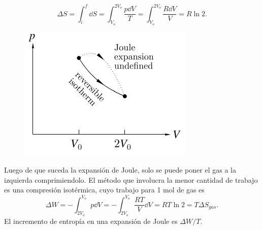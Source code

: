 	$$ \Delta S = \int _i ^f \dd{S} = \int _{V_o} ^{2V_o} \frac{p\dd{V}}{T} = \int _{V_o} ^{2V_o} \frac{R\dd{V}}{V} = R\ln{2}. $$



	\begin{figure}[H]
		\centering
		\includegraphics[scale=0.35]{./img/expansionJoule2.png}
		\label{expansionJoule}
	\end{figure}

Luego de que suceda la expansión de Joule, solo se puede poner el gas a la izquierda comprimiendolo. El método que involucra la menor cantidad de trabajo es una compresión isotérmica, cuyo trabajo para 1 mol de gas es
	$$ \Delta W = - \int _{2V_o} ^{V_o} p\dd{V} = - \int _{2V_o} ^{V_o} \frac{RT}{V} \dd{V} = RT\ln{2} = T \Delta S_{gas}. $$
El incremento de entropía en una expansión de Joule es $\Delta W/T$.


